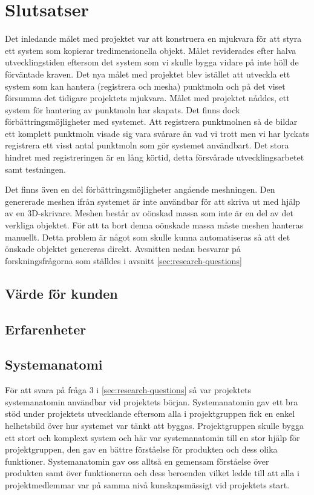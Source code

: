 \chapter{Slutsatser}
\label{cha:conclusion}
Det inledande målet med projektet var att konstruera en mjukvara för att styra ett system som kopierar tredimensionella objekt. Målet reviderades efter halva utvecklingstiden eftersom det system som vi skulle bygga vidare på inte höll de förväntade kraven. Det nya målet med projektet blev istället att utveckla ett system som kan hantera (registrera och mesha) punktmoln och på det viset försumma det tidigare projektets mjukvara. Målet med projektet nåddes, ett system för hantering av punktmoln har skapats. Det finns dock förbättringsmöjligheter med systemet. Att registrera punktmolnen så de bildar ett komplett punktmoln visade sig vara svårare än vad vi trott men vi har lyckats registrera ett visst antal punktmoln som gör systemet användbart. Det stora hindret med registreringen är en lång körtid, detta försvårade utvecklingsarbetet samt testningen. 

Det finns även en del förbättringsmöjligheter angående meshningen. Den genererade meshen ifrån systemet är inte användbar för att skriva ut med hjälp av en 3D-skrivare. Meshen består av oönskad massa som inte är en del av det verkliga objektet. För att ta bort denna oönskade massa måste meshen hanteras manuellt. Detta problem är något som skulle kunna automatiseras så att det önskade objektet genereras direkt. Avsnitten nedan besvarar på forskningsfrågorna som ställdes i avsnitt \ref{sec:research-questions}

\section{Värde för kunden}
\section{Erfarenheter}
\section{Systemanatomi}
För att svara på fråga 3 i \ref{sec:research-questions} så var projektets systemanatomin användbar vid projektets början. Systemanatomin gav ett bra stöd under projektets utvecklande eftersom alla i projektgruppen fick en enkel helhetsbild över hur systemet var tänkt att byggas. Projektgruppen skulle bygga ett stort och komplext system och här var systemanatomin till en stor hjälp för projektgruppen, den gav en bättre förståelse för produkten och dess olika funktioner. Systemanatomin gav oss alltså en gemensam förståelse över produkten samt över funktionerna och dess beroenden vilket ledde till att alla i projektmedlemmar var på samma nivå kunskapsmässigt vid projektets start.

